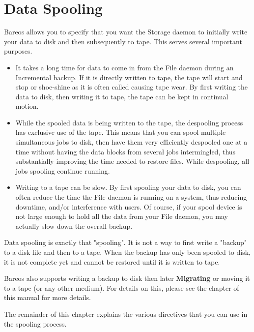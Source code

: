 
\chapter{Data Spooling}
\label{SpoolingChapter}

Bareos allows you to specify that you want the Storage daemon to initially
write your data to disk and then subsequently to tape. This serves several
important purposes.

\begin{itemize}
\item It takes a long time for data to come in from the File daemon during
   an Incremental backup.  If it is directly written to tape, the tape will
   start and stop or shoe-shine as it is often called causing tape wear.
   By first writing the data to disk, then writing it to tape, the tape can
   be kept in continual motion.
\item While the spooled data is being written to the tape, the despooling
   process has exclusive use of the tape.  This means that you can spool
   multiple simultaneous jobs to disk, then have them very efficiently
   despooled one at a time without having the data blocks from several jobs
   intermingled, thus substantially improving the time needed to restore
   files. While despooling, all jobs spooling continue running.
\item Writing to a tape can be slow.  By first spooling your data to disk,
   you can often reduce the time the File daemon is running on a system,
   thus reducing downtime, and/or interference with users.  Of course, if
   your spool device is not large enough to hold all the data from your
   File daemon, you may actually slow down the overall backup.
\end{itemize}

Data spooling is exactly that "spooling".  It is not a way to first write a
"backup" to a disk file and then to a tape.  When the backup has only been
spooled to disk, it is not complete yet and cannot be restored until it is
written to tape.

Bareos also supports writing a backup
to disk then later {\bf Migrating} or moving it to a tape (or any
other medium). For
details on this, please see the  chapter
of this manual for more details.

The remainder of this chapter explains the various directives that you can use
in the spooling process.

